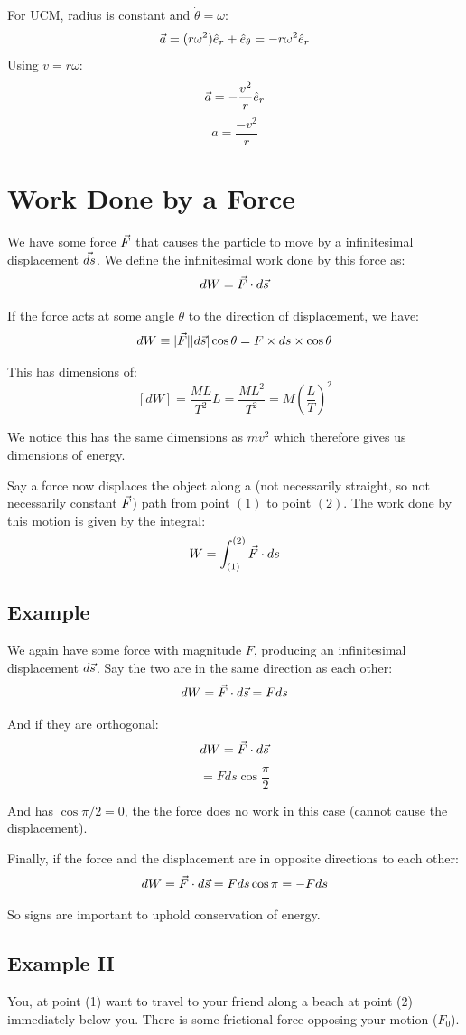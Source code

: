 For UCM, radius is constant and $ \dot{\theta} = \omega$:
\[
    \vec{a} = (r \omega^2) \hat{e}_r + \hat{e}_\theta = -r \omega^2 \hat{e}_r
\]
Using $v = r \omega$:
\[
    \vec{a} = -\frac{v^2}{r} \hat{e}_r
\]
\[
    a = \frac{-v^2}{r}
\]

\section{Work Done by a Force}
We have some force $\vec{F}$ that causes the particle to move by a infinitesimal displacement $\vec{ds}$. We define the infinitesimal work done by this force as:
\[
    dW = \vec{F} \cdot d\vec{s}
\]

If the force acts at some angle $\theta$ to the direction of displacement, we have:
\[
    dW \equiv | \vec{F} | | d \vec{s} | \cos \theta = F \times ds \times \cos \theta
\]

This has dimensions of:
\[
    [dW] = \frac{ML}{T^2} L = \frac{M L^2}{T^2} = M \left(\frac{L}{T}\right)^2
\]

We notice this has the same dimensions as $mv^2$ which therefore gives us dimensions of energy.

Say a force now displaces the object along a (not necessarily straight, so not necessarily constant $\vec{F}$) path from point $(1)$ to point $(2)$. The work done by this motion is given by the integral:
\[
    W = \int_{(1)}^{(2)} \vec{F} \cdot ds
\]

\subsection{Example}
We again have some force with magnitude $F$, producing an infinitesimal displacement $d \vec{s}$. Say the two are in the same direction as each other:
\[
    dW = \vec{F} \cdot d \vec{s} = Fds 
\]

And if they are orthogonal:
\[
    dW = \vec{F} \cdot d \vec{s}
\]
\[
    = F ds \cos \frac{\pi}{2}
\]

And has $\cos \pi / 2 = 0$, the the force does no work in this case (cannot cause the displacement).

Finally, if the force and the displacement are in opposite directions to each other:
\[
    dW = \vec{F} \cdot d \vec{s} = F ds \cos \pi = -F ds
\]

So signs are important to uphold conservation of energy.

\subsection{Example II}
You, at point (1) want to travel to your friend along a beach at point (2) immediately below you. There is some frictional force opposing your motion ($F_\text{0}$).

